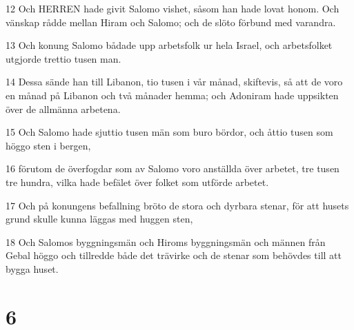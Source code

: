 \par 12 Och HERREN hade givit Salomo vishet, såsom han hade lovat honom. Och vänskap rådde mellan Hiram och Salomo; och de slöto förbund med varandra.
\par 13 Och konung Salomo bådade upp arbetsfolk ur hela Israel, och arbetsfolket utgjorde trettio tusen man.
\par 14 Dessa sände han till Libanon, tio tusen i vår månad, skiftevis, så att de voro en månad på Libanon och två månader hemma; och Adoniram hade uppsikten över de allmänna arbetena.
\par 15 Och Salomo hade sjuttio tusen män som buro bördor, och åttio tusen som höggo sten i bergen,
\par 16 förutom de överfogdar som av Salomo voro anställda över arbetet, tre tusen tre hundra, vilka hade befälet över folket som utförde arbetet.
\par 17 Och på konungens befallning bröto de stora och dyrbara stenar, för att husets grund skulle kunna läggas med huggen sten,
\par 18 Och Salomos byggningsmän och Hiroms byggningsmän och männen från Gebal höggo och tillredde både det trävirke och de stenar som behövdes till att bygga huset.

\chapter{6}

